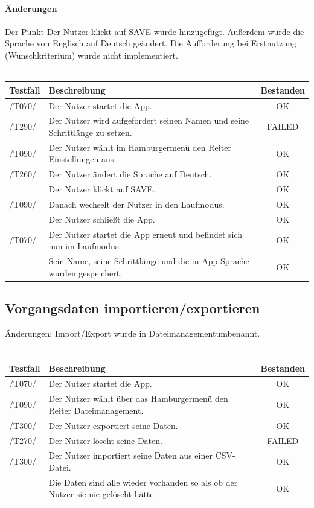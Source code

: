 \documentclass[a4paper,12pt]{article}
\newcommand{\testok}[0]{
	\cellcolor{green!25} OK
}
\newcommand{\testfailed}[0]{
	\cellcolor{red!25} FAILED
}
\begin{document}
\paragraph{Änderungen}
Der Punkt \glqq Der Nutzer klickt auf SAVE\grqq{} wurde hinzugefügt. Außerdem wurde die Sprache von Englisch auf Deutsch geändert. Die Aufforderung bei Erstnutzung (Wunschkriterium) wurde nicht implementiert.
\\
\\
\begin{tabular}{ |p{1.5cm} | p{12cm} | c| }
	\hline
	\textbf{Testfall} & \textbf{Beschreibung} & \textbf{Bestanden}\\
	\hline
	/T070/ & Der Nutzer startet die App. & \testok \\
	\hline
	/T290/ & Der Nutzer wird aufgefordert seinen Namen und seine Schrittlänge zu setzen. & \testfailed  \\
	\hline
	/T090/ & Der Nutzer wählt im Hamburgermenü den Reiter Einstellungen aus. & \testok  \\
	\hline
	/T260/ & Der Nutzer ändert die Sprache auf Deutsch. & \testok  \\
	\hline
	& Der Nutzer klickt auf \glqq SAVE\grqq . & \testok  \\
	\hline
	/T090/ & Danach wechselt der Nutzer in den \glqq Laufmodus\grqq . & \testok  \\
	\hline
	& Der Nutzer schließt die App. & \testok  \\
	\hline
	/T070/ & Der Nutzer startet die App erneut und befindet sich nun im \glqq Laufmodus\grqq . & \testok  \\
	\hline	
	& Sein Name, seine Schrittlänge und die in-App Sprache wurden gespeichert. & \testok  \\
	\hline
\end{tabular}



\subsection{Vorgangsdaten importieren/exportieren}
Änderungen: \glqq Import/Export\grqq{} wurde in \glqq Dateimanagement\grqq umbenannt.
\\
\\
\begin{tabular}{ |p{1.5cm} | p{12cm} | c| }
	\hline
	\textbf{Testfall} & \textbf{Beschreibung} & \textbf{Bestanden}\\
	\hline
	/T070/ & Der Nutzer startet die App. & \testok \\
	\hline
	/T090/ & Der Nutzer wählt über das Hamburgermenü den Reiter \glqq Dateimanagement\grqq . & \testok  \\
	\hline
	/T300/ & Der Nutzer exportiert seine Daten. & \testok \\
	\hline
	/T270/ & Der Nutzer löscht seine Daten. & \testfailed \\
	\hline
	/T300/ & Der Nutzer importiert seine Daten aus einer CSV-Datei. & \testok \\
	\hline
	& Die Daten sind alle wieder vorhanden so als ob der Nutzer sie nie gelöscht hätte. & \testok \\
	\hline
\end{tabular}
\end{document}
